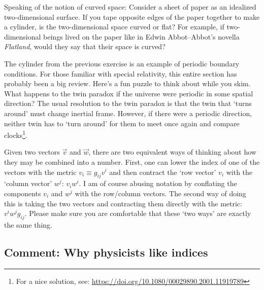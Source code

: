 \begin{exercise}
Speaking of the notion of curved space: Consider a sheet of paper as an idealized two-dimensional surface. If you tape opposite edges of the paper together to make a cylinder, is the two-dimensional space curved or flat? For example, if two-dimensional beings lived on the paper like in Edwin Abbot--Abbot's novella \emph{Flatland}, would they say that their space is curved? 
\end{exercise}
\begin{exercise}
The cylinder from the previous exercise is an example of periodic boundary conditions. For those familiar with special relativity, this entire section has probably been a big review. Here's a fun puzzle to think about while you skim. What happens to the twin paradox if the universe were periodic in some spatial direction? The usual resolution to the twin paradox is that the twin that `turns around' must change inertial frame. However, if there were a periodic direction, neither twin has to `turn around' for them to meet once again and compare clocks\footnote{For a nice solution, see: \url{https://doi.org/10.1080/00029890.2001.11919789}}.
\end{exercise}
\begin{example}\label{eg:two:ways:to:contract}
Given two vectors $\vec v$ and $\vec w$, there are two equivalent ways of thinking about how they may be combined into a number. First, one can lower the index of one of the vectors with the metric $v_i \equiv g_{ij}v^i$ and then contract the `row vector' $v_i$ with the `column vector' $w^j$: $v_iw^i$. I am of course abusing notation by conflating the components $v_i$ and $w^j$ with the row/column vectors. The second way of doing this is taking the two vectors and contracting them directly with the metric: $v^i w^j g_{ij}$. Please make sure you are comfortable that these `two ways' are exactly the same thing.
\end{example}

\subsection{Comment: Why physicists like indices}

